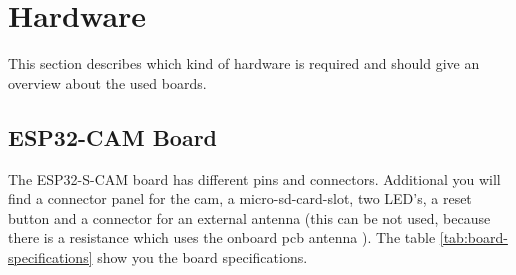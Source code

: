 \graphicspath{ {./hardware/pictures/} }
\section{Hardware}
This section describes which kind of hardware is required and should give an overview about
the used boards. 

\subsection{ESP32-CAM Board}
The ESP32-S-CAM board has different pins and connectors. Additional you will find
a connector panel for the cam, a micro-sd-card-slot, two LED's, a reset button and a connector for an external antenna (this can be not used, because there is a resistance which uses the onboard pcb antenna \cite{YoutubeESP32CamAntenna}).
The table \ref{tab:board-specifications} show you the board specifications.

